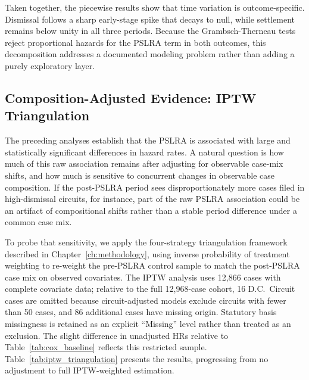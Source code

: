Taken together, the piecewise results show that time
variation is outcome-specific. Dismissal follows a sharp
early-stage spike that decays to null, while settlement
remains below unity in all three periods. Because the
Grambsch-Therneau tests reject proportional hazards for the
PSLRA term in both outcomes, this decomposition addresses a
documented modeling problem rather than adding a purely
exploratory layer.

\subsection{Composition-Adjusted Evidence: IPTW Triangulation}
\label{sec:results_iptw}

The preceding analyses establish that the PSLRA is associated
with large and statistically significant differences in
hazard rates. A natural question is how much of this raw
association remains after adjusting for observable case-mix
shifts, and how much is sensitive to
concurrent changes in observable case composition. If the
post-PSLRA period sees disproportionately more cases filed
in high-dismissal circuits, for instance, part of the raw
PSLRA association could be an artifact of compositional
shifts rather than a stable period difference under a common
case mix.

To probe that sensitivity, we apply the
four-strategy triangulation framework described in
Chapter~\ref{ch:methodology}, using inverse probability of
treatment weighting to re-weight the pre-PSLRA
control sample to match the post-PSLRA case mix on observed
covariates. The IPTW analysis uses 12,866 cases with
complete covariate data; relative to the full 12,968-case
cohort, 16 D.C.\ Circuit cases are omitted because
circuit-adjusted models exclude circuits with fewer than 50
cases, and 86 additional cases have missing origin.
Statutory basis missingness is retained as an explicit
``Missing'' level rather than treated as an exclusion. The
slight difference in
unadjusted HRs relative to Table~\ref{tab:cox_baseline}
reflects this restricted sample.
Table~\ref{tab:iptw_triangulation} presents the results,
progressing from no adjustment to full IPTW-weighted
estimation.

